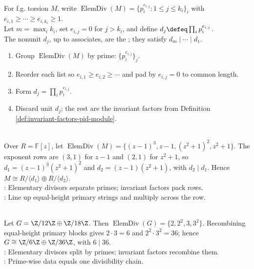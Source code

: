 \begin{definition} \label{def:invariant-factors-pid-module} \\
For f.g. torsion $M$, write $\operatorname{ElemDiv}(M)=\{p_i^{e_{i,j}}:1\leq j\leq k_i\}_i$ with $e_{i,1}\geq\cdots\geq e_{i,k_i}\geq1$.\\
Let $m=\max_i k_i$, set $e_{i,j}=0$ for $j>k_i$, and define $d_j\defeq\prod_i p_i^{e_{i,j}}$.\\
The nonunit $d_j$, up to associates, are the ; they satisfy $d_m\mid\cdots\mid d_1$.
\end{definition}

\begin{method} \label{meth:elementary-divisors-to-invariant-factors} 
\begin{enumerate}[label=(\roman*)]
\setlength{\itemsep}{0pt}
\item Group $\operatorname{ElemDiv}(M)$ by prime: $\{p_i^{e_{i,j}}\}_j$.
\item Reorder each list so $e_{i,1}\geq e_{i,2}\geq\cdots$ and pad by
$e_{i,j}=0$ to common length.
\item Form $d_j=\prod_i p_i^{e_{i,j}}$.
\item Discard unit $d_j$; the rest are the invariant factors from Definition
\ref{def:invariant-factors-pid-module}.
\end{enumerate}
\end{method}

\begin{example} \label{ex:elementary-divisors-to-invariant-factors-polynomial-module} \\
Over $R=\mathbb{F}[z]$, let $\operatorname{ElemDiv}(M)=\{(z-1)^3,z-1,(z^2+1)^2,z^2+1\}$. The exponent rows are $(3,1)$ for $z-1$ and $(2,1)$ for $z^2+1$, so $d_1=(z-1)^3(z^2+1)^2$ and $d_2=(z-1)(z^2+1)$, with $d_2\mid d_1$. Hence $M\cong R/\langle d_1\rangle\oplus R/\langle d_2\rangle$.\\
: Elementary divisors separate primes; invariant factors pack rows.\\
: Line up equal-height primary strings and multiply across the row.
\end{example}

\begin{example} \label{ex:elementary-divisors-recombine-to-invariant-factors} \\
Let $G=\Z/12\Z\oplus\Z/18\Z$. Then $\operatorname{ElemDiv}(G)=\{2,2^2,3,3^2\}$. Recombining equal-height primary blocks gives $2\cdot3=6$ and $2^2\cdot3^2=36$; hence $G\cong\Z/6\Z\oplus\Z/36\Z$, with $6\mid36$.\\
: Elementary divisors split by primes; invariant factors recombine them.\\
: Prime-wise data equals one divisibility chain.
\end{example}


